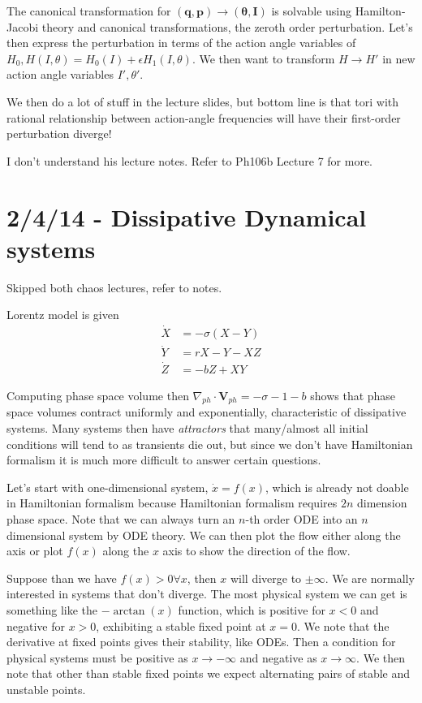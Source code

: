 \documentclass[10pt]{report}
\begin{document}
The canonical transformation for $(\mathbf{q},\mathbf{p}) \to (\mathbf{\theta}, \mathbf{I})$ is solvable using Hamilton-Jacobi theory and canonical transformations, the zeroth order perturbation. Let's then express the perturbation in terms of the action angle variables of $H_0, H(I,\theta) = H_0(I) + \epsilon H_1(I,\theta)$. We then want to transform $H\to H'$ in new action angle variables $I', \theta'$.

We then do a lot of stuff in the lecture slides, but bottom line is that tori with rational relationship between action-angle frequencies will have their first-order perturbation diverge!

I don't understand his lecture notes. Refer to Ph106b Lecture 7 for more.
\chapter{2/4/14 - Dissipative Dynamical systems}

Skipped both chaos lectures, refer to notes.

Lorentz model is given
\begin{align}
    \dot{X} &= -\sigma(X-Y)\\
    \dot{Y} &= rX - Y - XZ\\
    \dot{Z} &= -bZ + XY
\end{align}

Computing phase space volume then $\nabla_{ph}\cdot \mathbf{V}_{ph} = -\sigma - 1 - b$ shows that phase space volumes contract uniformly and exponentially, characteristic of dissipative systems. Many systems then have \emph{attractors} that many/almost all initial conditions will tend to as transients die out, but since we don't have Hamiltonian formalism it is much more difficult to answer certain questions.

Let's start with one-dimensional system, $\dot{x} = f(x)$, which is already not doable in Hamiltonian formalism because Hamiltonian formalism requires $2n$ dimension phase space. Note that we can always turn an $n$-th order ODE into an $n$ dimensional system by ODE theory. We can then plot the flow either along the axis or plot $f(x)$ along the $x$ axis to show the direction of the flow. 

Suppose than we have $f(x) > 0 \forall x$, then $x$ will diverge to $\pm \infty$. We are normally interested in systems that don't diverge. The most physical system we can get is something like the $-\arctan(x)$ function, which is positive for $x < 0$ and negative for $x > 0$, exhibiting a stable fixed point at $x=0$. We note that the derivative at fixed points gives their stability, like ODEs. Then a condition for physical systems must be positive as $x \to -\infty$ and negative as $x \to \infty$. We then note that other than stable fixed points we expect alternating pairs of stable and unstable points. 
\end{document}
